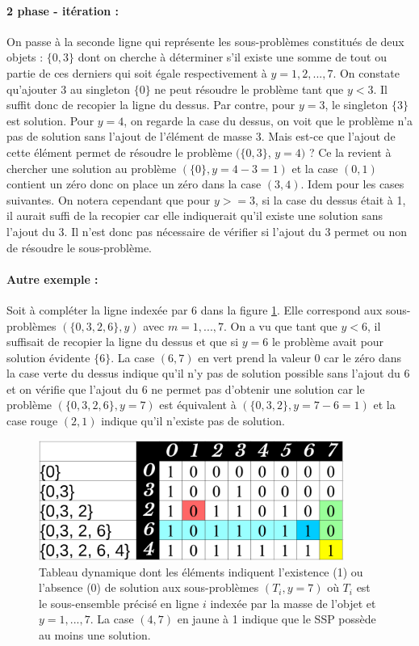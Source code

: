 \paragraph{2\ieme{} phase - itération :} On passe à la seconde ligne qui représente les sous-problèmes constitués de deux objets : $\{0, 3\}$
dont on cherche à déterminer s'il existe une somme de tout ou partie de ces derniers qui soit égale respectivement à $y = 1, 2, ...,7$.
On constate qu'ajouter 3 au singleton  $\{0\}$ ne peut résoudre le problème tant que $y < 3$. Il suffit donc de recopier la ligne du dessus.
Par contre, pour $y = 3$, le singleton $\{3\}$ est solution. Pour $y = 4$, on regarde la case du dessus, on voit que le problème n'a pas de solution
sans l'ajout de l'élément de masse 3. Mais est-ce que l'ajout de cette élément permet de résoudre le problème $(\{0, 3\}$, $y = 4)$ ?
Ce la revient à chercher une solution au problème $(\{0\}, y = 4 - 3 = 1)$ et la case $(0,1)$ contient un zéro donc on place un zéro dans la case $(3, 4)$. Idem pour les cases suivantes. On notera cependant que pour $y >= 3$, si la case du dessus
était à 1, il aurait suffi de la recopier car elle indiquerait qu'il existe une solution sans l'ajout du 3. Il n'est donc pas nécessaire de vérifier 
si l'ajout du 3 permet ou non de résoudre le sous-problème.

\paragraph{Autre exemple :} Soit à compléter la ligne indexée par 6 dans la figure \ref{dyn1}. Elle correspond aux sous-problèmes $(\{0, 3, 2, 6\}, y)$
avec $m = 1,...,7$. On a vu que tant que $y < 6$, il suffisait de recopier la ligne du dessus et que si $y = 6$ le problème avait pour solution évidente $\{6\}$.
La case $(6,7)$ en vert prend la valeur 0 car le zéro dans la case verte du dessus indique qu'il n'y pas de solution possible sans l'ajout du 6 et
on vérifie que l'ajout du 6 ne permet pas d'obtenir une solution car le problème $(\{0, 3, 2, 6\}, y = 7)$ est équivalent à $(\{0, 3, 2\}, y = 7 - 6 = 1)$ et la case rouge $(2,1)$ indique qu'il n'existe pas de solution. 
\begin{figure}[htp]
  \centering
  \includegraphics[width=10cm]{images/dyn1}
  \caption{Tableau dynamique dont les éléments indiquent l'existence (1) ou l'absence (0) de solution aux sous-problèmes $(T_i , y = 7)$ où $T_i$ est le sous-ensemble
  précisé en ligne $i$ indexée par la masse de l'objet et $y = 1, ...,7$. La case $(4,7)$ en jaune à 1 indique que le SSP possède au moins une solution.}
  \label{dyn1}
\end{figure}



